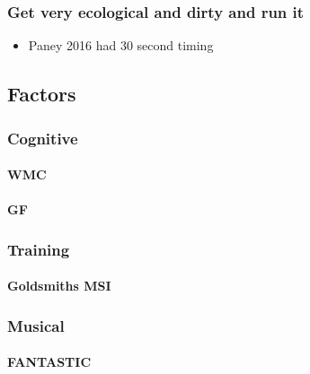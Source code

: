 \documentclass[]{book}
\providecommand{\tightlist}{%
  \setlength{\itemsep}{0pt}\setlength{\parskip}{0pt}}
\let\oldparagraph\paragraph
\renewcommand{\paragraph}[1]{\oldparagraph{#1}\mbox{}}
\theoremstyle{definition}
\theoremstyle{definition}
\theoremstyle{definition}
\theoremstyle{remark}
\begin{document}
\hypertarget{get-very-ecological-and-dirty-and-run-it}{%
\subsubsection{Get very ecological and dirty and run
it}\label{get-very-ecological-and-dirty-and-run-it}}

\begin{itemize}
\tightlist
\item
  Paney 2016 had 30 second timing
\end{itemize}

\hypertarget{factors}{%
\subsection{Factors}\label{factors}}

\hypertarget{cognitive-1}{%
\subsubsection{Cognitive}\label{cognitive-1}}

\hypertarget{wmc}{%
\paragraph{WMC}\label{wmc}}

\hypertarget{gf}{%
\paragraph{GF}\label{gf}}

\hypertarget{training}{%
\subsubsection{Training}\label{training}}

\hypertarget{goldsmiths-msi}{%
\paragraph{Goldsmiths MSI}\label{goldsmiths-msi}}

\hypertarget{musical}{%
\subsubsection{Musical}\label{musical}}

\hypertarget{fantastic-1}{%
\paragraph{FANTASTIC}\label{fantastic-1}}
\end{document}
